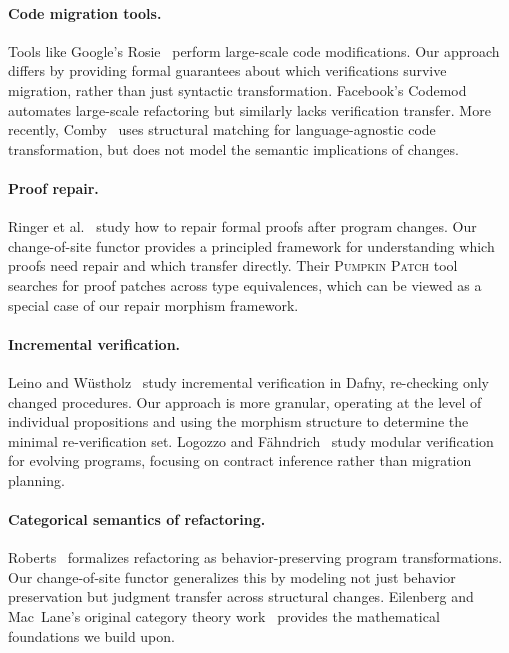 \documentclass[11pt]{article}
\begin{document}
\paragraph{Code migration tools.}
Tools like Google's Rosie~\cite{Wright2019} perform large-scale code
modifications.  Our approach differs by providing formal guarantees about
which verifications survive migration, rather than just syntactic
transformation.  Facebook's Codemod~\cite{Codemod2013} automates
large-scale refactoring but similarly lacks verification transfer.
More recently, Comby~\cite{Comby2019} uses structural matching for
language-agnostic code transformation, but does not model the semantic
implications of changes.

\paragraph{Proof repair.}
Ringer et al.~\cite{Ringer2021} study how to repair formal proofs after
program changes.  Our change-of-site functor provides a principled
framework for understanding which proofs need repair and which transfer
directly.  Their \textsc{Pumpkin Patch} tool~\cite{Ringer2019} searches
for proof patches across type equivalences, which can be viewed as a
special case of our repair morphism framework.

\paragraph{Incremental verification.}
Leino and Wüstholz~\cite{Leino2014} study incremental verification in
Dafny, re-checking only changed procedures.  Our approach is more granular,
operating at the level of individual propositions and using the morphism
structure to determine the minimal re-verification set.
Logozzo and Fähndrich~\cite{Logozzo2008} study modular verification for
evolving programs, focusing on contract inference rather than migration
planning.

\paragraph{Categorical semantics of refactoring.}
Roberts~\cite{Roberts1999} formalizes refactoring as behavior-preserving
program transformations.  Our change-of-site functor generalizes this by
modeling not just behavior preservation but judgment transfer across
structural changes.  Eilenberg and Mac~Lane's original category theory
work~\cite{MacLane1998} provides the mathematical foundations we build upon.
\end{document}
